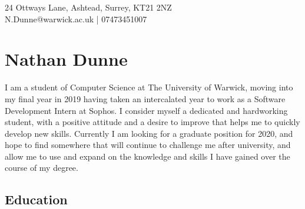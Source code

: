 \documentclass[11pt]{article}
\newcommand{\linesep}{\noindent\makebox[\linewidth]{\rule{\linewidth}{0.2pt}}}
\begin{document}
\hspace*{\fill} 24 Ottways Lane, Ashtead, Surrey, KT21 2NZ \\
\hspace*{\fill} N.Dunne@warwick.ac.uk | 07473451007
\section*{Nathan Dunne}

I am a student of Computer Science at The University of Warwick, moving into my final year in 2019 having taken an intercalated year to work as a Software Development Intern at Sophos. I consider myself a dedicated and hardworking student, with a positive attitude and a desire to improve that helps me to quickly develop new skills. Currently I am looking for a graduate position for 2020, and hope to find somewhere that will continue to challenge me after university, and allow me to use and expand on the knowledge and skills I have gained over the course of my degree.

\linesep
\subsection*{Education}

\newcommand\result[7]{\node[commit] (#1) {}; 
  \node[llabel] at (#1) {
  #3\\
  \textcolor{darkgray}{#6}\\
  \hspace*{4ex}#7
  };
  \node[rlabel, text width=\textwidth-#2em] at (#1) {#5};
}

\newcommand\ghost[1]{\coordinate (#1);}
\newcommand\connect[2]{\path (#1) to[out=90,in=-90] (#2);}
\end{document}
